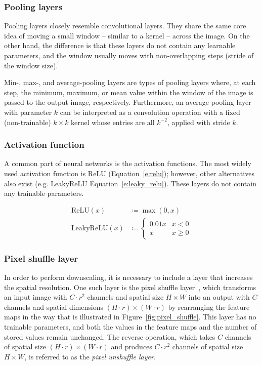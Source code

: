 \subsubsection{Pooling layers}
\label{sss:pooling}

Pooling layers closely resemble convolutional layers. 
They share the same core idea of moving a small window -- similar to a kernel -- across the image.
On the other hand, the difference is that these layers do not contain any learnable parameters, and the window usually moves with non-overlapping steps (stride of the window size).

Min-, max-, and average-pooling layers are types of pooling layers where, at each step, the minimum, maximum, or mean value within the window of the image is passed to the output image, respectively.
Furthermore, an average pooling layer with parameter $k$ can be interpreted as a convolution operation with a fixed (non-trainable) $k \times k$ kernel whose entries are all $k^{-2}$, applied with stride $k$.


\subsubsection{Activation function}

A common part of neural networks is the activation functions.
The most widely used activation function is ReLU (Equation~\eqref{e:relu}); however, other alternatives also exist (e.g. LeakyReLU Equation~\eqref{e:leaky_relu}).
These layers do not contain any trainable parameters.

\begin{align}
    \text{ReLU}(x) &\coloneqq \max(0, x) \label{e:relu} \\
    \text{LeakyReLU}(x) &\coloneqq 
        \begin{cases}
            0.01 x & x < 0 \\
            x & x \ge 0
        \end{cases}
        \label{e:leaky_relu}
\end{align}

\subsubsection{Pixel shuffle layer}

In order to perform downscaling, it is necessary to include a layer that increases the spatial resolution. 
One such layer is the pixel shuffle layer~\cite{Shi2016}, which transforms an input image with $C \cdot r^2$ channels and spatial size $H \times W$ into an output with $C$ channels and spatial dimensions $(H \cdot r) \times (W \cdot r)$ by rearranging the feature maps in the way that is illustrated in Figure~\ref{fig:pixel_shuffle}.
This layer has no trainable parameters, and both the values in the feature maps and the number of stored values remain unchanged.
The reverse operation, which takes $C$ channels of spatial size $(H \cdot r) \times (W \cdot r)$ and produces $C \cdot r^2$ channels of spatial size $H \times W$, is referred to as the \textit{pixel unshuffle layer}.

